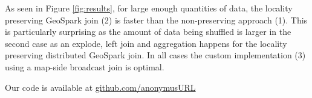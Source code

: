 \documentclass[conference]{IEEEtran}
\begin{document}

As seen in Figure \ref{fig:results}, for large enough quantities of data, the locality preserving GeoSpark join (2) is faster than the non-preserving approach (1). This is particularly surprising as the amount of data being shuffled is larger in the second case as an explode, left join and aggregation happens for the locality preserving distributed GeoSpark join. In all cases the custom implementation (3) using a map-side broadcast join is optimal.

Our code is available at \url{github.com/anonymusURL}

\end{document}
